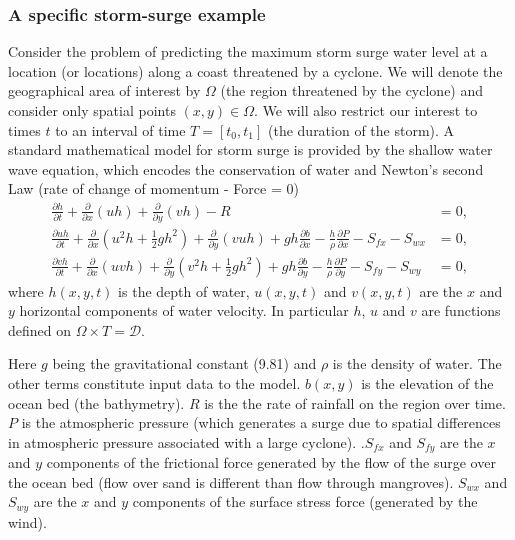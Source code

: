 

\subsubsection*{A specific storm-surge example}
Consider the problem of predicting the maximum 
storm surge water level at a location (or locations) along a coast threatened by a cyclone. We will denote the geographical area of interest by $\Omega$ 
(the region threatened by the cyclone) and consider only 
spatial points $(x,y) \in \Omega$. We will also restrict our interest to times $t$ to an interval of time $T = [t_0, t_1]$ (the duration of the storm). 
A standard mathematical model for storm surge is provided 
by the shallow water wave equation,  which encodes the conservation of water and Newton's second Law (rate of change of momentum - Force = 0) 
\begin{subequations}
 \label{eqn:storm} 
\begin{align}
\frac{\partial h}{\partial t} +
\frac{\partial }{\partial x} \left(uh\right) + \frac{\partial }{\partial y} \left(vh\right) -R & =  0 ,\\
\frac{\partial uh}{\partial t} +
\frac{\partial }{\partial x} \left(u^2h +  \frac12 gh^2 \right) 
+ \frac{\partial }{\partial y} \left(vuh\right) + gh \frac{\partial b}{\partial x} 
- \frac{h}{\rho} \frac{\partial P}{\partial  x} - S_{fx} - S_{wx}  &= 0 ,   \\
\frac{\partial vh}{\partial t} +
\frac{\partial }{\partial x} \left(uvh  \right) 
+ \frac{\partial }{\partial y} \left(v^2h + \frac12 g h^2 \right) + gh \frac{\partial b}{\partial y} 
- \frac{h}{\rho} \frac{\partial P}{\partial  y} - S_{fy} -  S_{wy}& = 0,  
\end{align}
\end{subequations}
where $h(x,y,t)$ is the depth of water, $u(x,y,t)$ and $v(x,y,t)$ are the $x$ and $y$ horizontal components of water velocity. In particular $h$, $u$ and $v$ are functions defined on $\Omega \times T = \mathcal{D}$. 

Here $g$ being the gravitational constant (9.81) and $\rho$ is the density of water. 
The other terms constitute input data to the model. 
 $b(x,y)$ is the  elevation of the ocean bed (the bathymetry).
$R$ is the the rate of rainfall on the region over time.
$P$ is the atmospheric pressure (which generates a surge due to spatial differences in atmospheric pressure associated with a large cyclone).
.$S_{fx}$ and $S_{fy}$ are the $x$ and $y$ components of the frictional force generated by the flow of the surge over the ocean bed (flow over sand is different than flow through mangroves).
$S_{wx}$ and $S_{wy}$ are the $x$ and $y$ components of the surface stress force (generated by the wind). 

